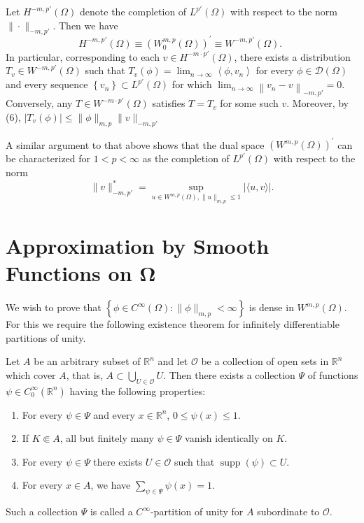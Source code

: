 \begin{para}
  Let $H^{-m, p'}(\Omega)$ denote the completion of $L^{p'}(\Omega)$
  with respect to the norm $\|\cdot\|_{-m, p'}$. Then we have
  \[
  H^{-m, p'}(\Omega) \equiv\left(W_0^{m, p}(\Omega)\right)^{\prime} \equiv W^{-m, p'}(\Omega) \text {. }
  \]
  In particular, corresponding to each $v \in H^{-m \cdot p'}(\Omega)$, there exists a 
  distribution $T_v \in W^{-m, p'}(\Omega)$ such that
  $T_v(\phi)=\lim _{n \rightarrow \infty}\left\langle\phi, v_n\right\rangle$
  for every $\phi \in \mathscr{D}(\Omega)$ and every sequence
  $\left\{v_n\right\} \subset L^{p'}(\Omega)$ for which
  $\lim _{n \rightarrow \infty}\left\|v_n-v\right\|_{-m, p'}=0$.
  Conversely, any $T \in W^{-m \cdot p'}(\Omega)$ satisfies $T=T_v$ for some such $v$.
  Moreover, by (6), $\left|T_v(\phi)\right| \leq\|\phi\|_{m, p}\|v\|_{-m, p'}$
\end{para}

\begin{para}
  A similar argument to that above shows that the dual space $\left(W^{m, p}(\Omega)\right)^{\prime}$ can be characterized for $1<p<\infty$ as the completion of $L^{p'}(\Omega)$ with respect to the norm
  \[
  \|v\|_{-m, p'}^*
    = \sup _{u \in W^{m, p}(\Omega),\|u\|_{m,p} \leq 1}|\langle u, v\rangle|.
  \]
\end{para}


\section[Approximation by Smooth Functions on $\Omega$]%
  {Approximation by Smooth Functions on $\bm{\Omega}$}

We wish to prove that $\left\{\phi \in C^{\infty}(\Omega):\|\phi\|_{m, p}<\infty\right\}$
is dense in $W^{m, p}(\Omega)$. For this we require the following existence theorem for
infinitely differentiable partitions of unity.

\begin{theorem}
  Let $A$ be an arbitrary subset of $\mathbb{R}^n$ and let $\mathscr{O}$ be a collection of open 
  sets in $\mathbb{R}^n$ which cover $A$, that is, $A \subset \bigcup_{U \in \mathscr{O}} U$.
  Then there exists a collection $\Psi$ of functions $\psi \in C_0^{\infty}\left(\mathbb{R}^n\right)$ having the following properties:
  \begin{enumerate}[label = (\roman*)]
    \item For every $\psi \in \Psi$ and every $x \in \mathbb{R}^n$, $0 \leq \psi(x) \leq 1$.
    \item If $K \Subset A$, all but finitely many $\psi \in \Psi$ vanish identically on $K$.
    \item For every $\psi \in \Psi$ there exists $U \in \mathscr{O}$ such that $\operatorname{supp}(\psi) \subset U$.
    \item For every $x \in A$, we have $\sum_{\psi \in \Psi} \psi(x)=1$.
  \end{enumerate}
  Such a collection $\Psi$ is called a $C^{\infty}$-partition of unity for $A$ subordinate to $\mathscr{O}$.
\end{theorem}


